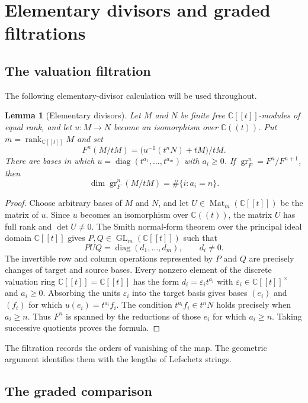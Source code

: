 \documentclass[11pt]{amsart}
\newtheorem{lemma}[theorem]{Lemma}
\theoremstyle{definition}
\theoremstyle{remark}
\newcommand{\C}{\mathbb C}
\newcommand{\A}{\C[[t]]}
\newcommand{\K}{\C((t))}
\newcommand{\Gr}{\operatorname{gr}}
\begin{document}
\section{Elementary divisors and graded filtrations}

\subsection{The valuation filtration}

The following elementary-divisor calculation will be used throughout.

\begin{lemma}[Elementary divisors]\label{lem:ed}
Let $M$ and $N$ be finite free $\A$-modules of equal rank, and let
$u:M\to N$ become an isomorphism over $\K$.  Put
$m=\operatorname{rank}_{\A}M$ and set
\[
 F^n(M/tM)=\bigl(u^{-1}(t^nN)+tM\bigr)/tM.
\]
There are bases in which $u=\operatorname{diag}(t^{a_1},\ldots,t^{a_m})$
with $a_i\geq0$.  If
$\Gr_F^n=F^n/F^{n+1}$, then
\[
 \dim\Gr_F^n(M/tM)=\#\{i:a_i=n\}.
\]
\end{lemma}

\begin{proof}
Choose arbitrary bases of $M$ and $N$, and let $U\in\operatorname{Mat}_m(\A)$
be the matrix of $u$.  Since $u$ becomes an isomorphism over $\K$, the matrix
$U$ has full rank and $\det U\ne0$.  The Smith normal-form theorem over the
principal ideal domain $\A$ gives $P,Q\in\operatorname{GL}_m(\A)$ such that
\[
 PUQ=\operatorname{diag}(d_1,\ldots,d_m),
 \qquad d_i\ne0.
\]
The invertible row and column operations represented by $P$ and $Q$ are
precisely changes of target and source bases.  Every nonzero element of the discrete valuation ring
$\A=\mathbb C[[t]]$ has the form $d_i=\varepsilon_i t^{a_i}$ with
$\varepsilon_i\in\A^\times$ and $a_i\geq0$.  Absorbing the units
$\varepsilon_i$ into the target basis gives bases $(e_i)$ and $(f_i)$ for
which $u(e_i)=t^{a_i}f_i$.  The condition
$t^{a_i}f_i\in t^nN$ holds precisely when
$a_i\geq n$.  Thus $F^n$ is spanned by the reductions of those $e_i$ for
which $a_i\geq n$.  Taking successive quotients proves the formula.
\end{proof}

The filtration records the orders of vanishing of the map.  The geometric
argument identifies them with the lengths of Lefschetz strings.

\subsection{The graded comparison}
\end{document}
